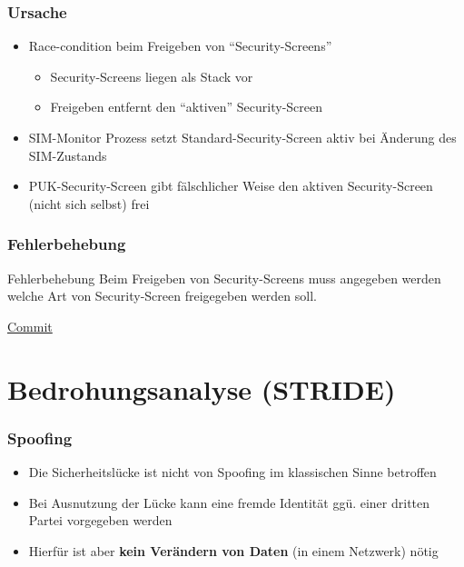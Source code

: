 \documentclass{beamer}
\begin{document}
\begin{frame}
\frametitle{Ursache}
\begin{itemize}
    \item Race-condition beim Freigeben von ``Security-Screens''
    \begin{itemize}
        \item Security-Screens liegen als Stack vor
        \item Freigeben entfernt den ``aktiven'' Security-Screen
    \end{itemize}
    \item SIM-Monitor Prozess setzt Standard-Security-Screen aktiv bei Änderung des SIM-Zustands
    \item PUK-Security-Screen gibt fälschlicher Weise den aktiven Security-Screen (nicht sich selbst) frei
\end{itemize}
\end{frame}

\begin{frame}
\frametitle{Fehlerbehebung}
\begin{block}{Fehlerbehebung}
    Beim Freigeben von Security-Screens muss angegeben werden welche Art
    von Security-Screen freigegeben werden soll.
    
    \hfill \href{https://github.com/aosp-mirror/platform_frameworks_base/commit/ecbed81c3a331f2f0458923cc7e744c85ece96da}{Commit}
\end{block}
\end{frame}


\section{Bedrohungsanalyse (STRIDE)}

\begin{frame}
\frametitle{Spoofing}
\begin{itemize}
    \item Die Sicherheitslücke ist nicht von Spoofing im klassischen Sinne betroffen
    \item Bei Ausnutzung der Lücke kann eine fremde Identität ggü. einer dritten Partei vorgegeben werden
    \item Hierfür ist aber \textbf{kein Verändern von Daten} (in einem Netzwerk) nötig
\end{itemize}
\end{frame}
\end{document}
